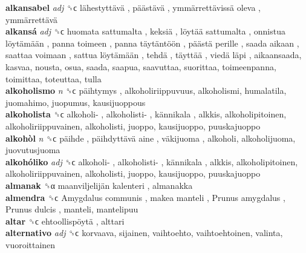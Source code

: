 \textbf{alkansabel} \emph{adj}  ␝ϲ   lähestyttävä ,  päästävä ,  ymmärrettävissä oleva ,  ymmärrettävä   \\
\textbf{alkansá} \emph{adj}  ␝ϲ   huomata sattumalta ,  keksiä ,  löytää sattumalta ,  onnistua löytämään ,  panna toimeen ,  panna täytäntöön ,  päästä perille ,  saada aikaan ,  saattaa voimaan ,  sattua löytämään ,  tehdä ,  täyttää ,  viedä läpi , aikaansaada, kasvaa, nousta, osua, saada, saapua, saavuttaa, suorittaa, toimeenpanna, toimittaa, toteuttaa, tulla  \\
\textbf{alkoholismo} \emph{n}  ␝ϲ   päihtymys , alkoholiriippuvuus, alkoholismi, humalatila, juomahimo, juopumus, kausijuoppous  \\
\textbf{alkoholista} ␝ϲ   alkoholi- ,  alkoholisti- ,  kännikala , alkkis, alkoholipitoinen, alkoholiriippuvainen, alkoholisti, juoppo, kausijuoppo, puuskajuoppo  \\
\textbf{alkohòl} \emph{n}  ␝ϲ   päihde ,  päihdyttävä aine ,  väkijuoma , alkoholi, alkoholijuoma, juovutusjuoma  \\
\textbf{alkohóliko} \emph{adj}  ␝ϲ   alkoholi- ,  alkoholisti- ,  kännikala , alkkis, alkoholipitoinen, alkoholiriippuvainen, alkoholisti, juoppo, kausijuoppo, puuskajuoppo  \\
\textbf{almanak} ␝α   maanviljelijän kalenteri , almanakka  \\
\textbf{almendra} ␝ϲ   Amygdalus communis ,  makea manteli ,  Prunus amygdalus ,  Prunus dulcis , manteli, mantelipuu  \\
\textbf{altar} ␝ϲ   ehtoollispöytä , alttari  \\
\textbf{alternativo} \emph{adj}  ␝ϲ  korvaava, sijainen, vaihtoehto, vaihtoehtoinen, valinta, vuoroittainen  \\
